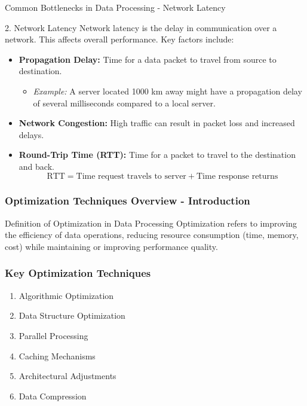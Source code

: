 \documentclass[aspectratio=169]{beamer}
\begin{document}
\begin{frame}[fragile]{Common Bottlenecks in Data Processing - Network Latency}
    \begin{block}{2. Network Latency}
        Network latency is the delay in communication over a network. This affects overall performance. Key factors include:
        \begin{itemize}
            \item \textbf{Propagation Delay:} Time for a data packet to travel from source to destination.
            \begin{itemize}
                \item \textit{Example:} A server located 1000 km away might have a propagation delay of several milliseconds compared to a local server.
            \end{itemize}
            \item \textbf{Network Congestion:} High traffic can result in packet loss and increased delays.
            \item \textbf{Round-Trip Time (RTT):} Time for a packet to travel to the destination and back.
            \begin{equation}
                \text{RTT} = \text{Time request travels to server} + \text{Time response returns}
            \end{equation}
        \end{itemize}
    \end{block}
\end{frame}

\begin{frame}[fragile]
    \frametitle{Optimization Techniques Overview - Introduction}
    \begin{block}{Definition of Optimization in Data Processing}
        Optimization refers to improving the efficiency of data operations, reducing resource consumption (time, memory, cost) while maintaining or improving performance quality.
    \end{block}
\end{frame}

\begin{frame}[fragile]
    \frametitle{Key Optimization Techniques}
    \begin{enumerate}
        \item Algorithmic Optimization
        \item Data Structure Optimization
        \item Parallel Processing
        \item Caching Mechanisms
        \item Architectural Adjustments
        \item Data Compression
    \end{enumerate}
\end{frame}
\end{document}
